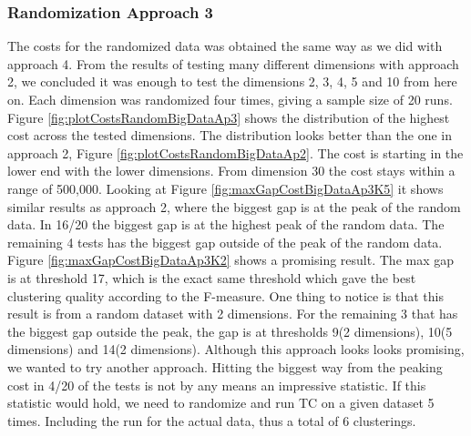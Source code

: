 \documentclass[a4paper,10pt]{article}
\theoremstyle{plain}
\theoremstyle{definition}
\begin{document}
\subsubsection{Randomization Approach 3}
The costs for the randomized data was obtained the same way as we did with approach 4. From the results of testing many different dimensions with approach 2, we concluded it was enough to test the dimensions 2, 3, 4, 5 and 10 from here on. Each dimension was randomized four times, giving a sample size of 20 runs. Figure \ref{fig:plotCostsRandomBigDataAp3} shows the distribution of the highest cost across the tested dimensions. The distribution looks better than the one in approach 2, Figure \ref{fig:plotCostsRandomBigDataAp2}. The cost is starting in the lower end with the lower dimensions. From dimension 30 the cost stays within a range of 500,000. Looking at Figure \ref{fig:maxGapCostBigDataAp3K5} it shows similar results as approach 2, where the biggest gap is at the peak of the random data. In 16/20 the biggest gap is at the highest peak of the random data. The remaining 4 tests has the biggest gap outside of the peak of the random data. Figure \ref{fig:maxGapCostBigDataAp3K2} shows a promising result. The max gap is at threshold 17, which is the exact same threshold which gave the best clustering quality according to the F-measure. One thing to notice is that this result is from a random dataset with 2 dimensions. For the remaining 3 that has the biggest gap outside the peak, the gap is at thresholds 9(2 dimensions), 10(5 dimensions) and 14(2 dimensions). Although this approach looks looks promising, we wanted to try another approach. Hitting the biggest way from the peaking cost in 4/20 of the tests is not by any means an impressive statistic. If this statistic would hold, we need to randomize and run TC on a given dataset 5 times. Including the run for the actual data, thus a total of 6 clusterings.
\end{document}
